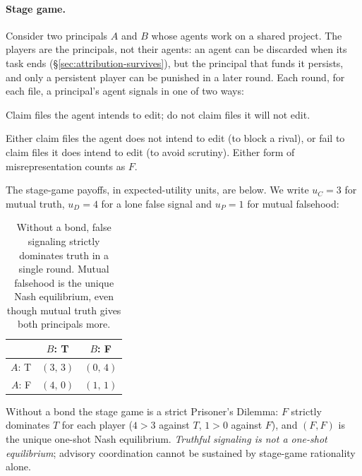 \documentclass[11pt,a4paper]{article}
\theoremstyle{definition}
\theoremstyle{remark}
\begin{document}
\paragraph{Stage game.}
Consider two principals $A$ and $B$ whose agents work on a shared project. The players are the principals, not their agents: an agent can be discarded when its task ends (\S\ref{sec:attribution-survives}), but the principal that funds it persists, and only a persistent player can be punished in a later round. Each round, for each file, a principal's agent signals in one of two ways:
\begin{description}[nosep]
  \item[\textbf{T (Truthful).}] Claim files the agent intends to edit; do not claim files it will not edit.
  \item[\textbf{F (False).}] Either claim files the agent does not intend to edit (to block a rival), or fail to claim files it does intend to edit (to avoid scrutiny). Either form of misrepresentation counts as $F$.
\end{description}

The stage-game payoffs, in expected-utility units, are below. We write $u_C=3$ for mutual truth, $u_D=4$ for a lone false signal and $u_P=1$ for mutual falsehood:

\begin{table}[H]
\centering
\caption{Without a bond, false signaling strictly dominates truth in a single round. Mutual falsehood is the unique Nash equilibrium, even though mutual truth gives both principals more.}
\label{tab:claim-stage-game}
\begin{tabular}{@{}rcc@{}}
\toprule
 & $B$: T & $B$: F \\
\midrule
$A$: T & $(3,\,3)$ & $(0,\,4)$ \\
$A$: F & $(4,\,0)$ & $(1,\,1)$ \\
\bottomrule
\end{tabular}
\end{table}

Without a bond the stage game is a strict Prisoner's Dilemma: $F$ strictly dominates $T$ for each player ($4 > 3$ against $T$, $1 > 0$ against $F$), and $(F, F)$ is the unique one-shot Nash equilibrium. \emph{Truthful signaling is not a one-shot equilibrium}; advisory coordination cannot be sustained by stage-game rationality alone.
\end{document}
